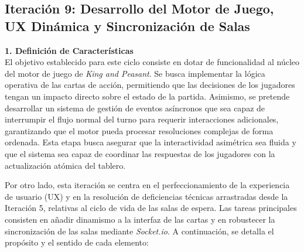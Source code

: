 \subsection{Iteración 9: Desarrollo del Motor de Juego, UX Dinámica y Sincronización de Salas}

\textbf{1. Definición de Características} \\
El objetivo establecido para este ciclo consiste en dotar de funcionalidad al núcleo del motor de juego de \textit{King and Peasant}. Se busca implementar la lógica operativa de las cartas de acción, permitiendo que las decisiones de los jugadores tengan un impacto directo sobre el estado de la partida. Asimismo, se pretende desarrollar un sistema de gestión de eventos asíncronos que sea capaz de interrumpir el flujo normal del turno para requerir interacciones adicionales, garantizando que el motor pueda procesar resoluciones complejas de forma ordenada. Esta etapa busca asegurar que la interactividad asimétrica sea fluida y que el sistema sea capaz de coordinar las respuestas de los jugadores con la actualización atómica del tablero.

Por otro lado, esta iteración se centra en el perfeccionamiento de la experiencia de usuario (UX) y en la resolución de deficiencias técnicas arrastradas desde la Iteración 5, relativas al ciclo de vida de las salas de espera. Las tareas principales consisten en añadir dinamismo a la interfaz de las cartas y en robustecer la sincronización de las salas mediante \textit{Socket.io}. A continuación, se detalla el propósito y el sentido de cada elemento:

